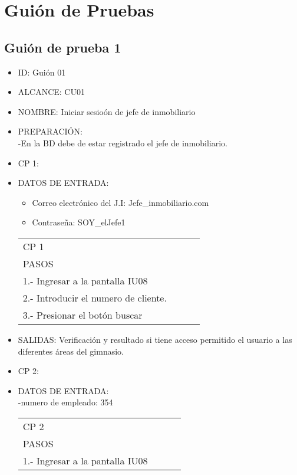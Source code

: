 \section{Guión de Pruebas}

\subsection{Guión de prueba 1}
\begin{itemize}
\item ID: Guión 01
\item ALCANCE: CU01
\item NOMBRE: Iniciar sesioón de jefe de inmobiliario  
\item PREPARACIÓN:\\
-En la BD debe de estar registrado el jefe de inmobiliario.
\item CP 1:
\item DATOS DE ENTRADA:\\
	\begin{itemize}
		\item Correo electrónico del J.I: Jefe\_inmobiliario\@hotmail.com
		\item Contraseña: SOY\_elJefe1
	\end{itemize}
\begin{center}			
	\begin{tabular}{|l|l|l|l|}
		\hline
		CP 1\\
		PASOS\\
		\hline 1.- Ingresar a la pantalla IU08\\
		\hline 2.- Introducir el numero de cliente.\\
		\hline 3.- Presionar el botón buscar\\
		\hline
	\end{tabular}
\end{center}
\item SALIDAS: Verificación y resultado si tiene acceso permitido el usuario a las diferentes 
áreas del gimnasio.
\item CP 2:
\item DATOS DE ENTRADA:\\
-numero de empleado: 354\\
\begin{center}			
	\begin{tabular}{|l|l|l|l|}
		\hline
		CP 2\\
		PASOS\\
		\hline 1.- Ingresar a la pantalla IU08\\

\end{tabular}
\end{center}
\end{itemize}
